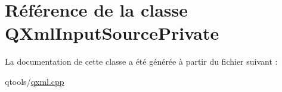 \hypertarget{class_q_xml_input_source_private}{}\section{Référence de la classe Q\+Xml\+Input\+Source\+Private}
\label{class_q_xml_input_source_private}


La documentation de cette classe a été générée à partir du fichier suivant \+:\begin{DoxyCompactItemize}
\item 
qtools/\hyperlink{qxml_8cpp}{qxml.\+cpp}\end{DoxyCompactItemize}
